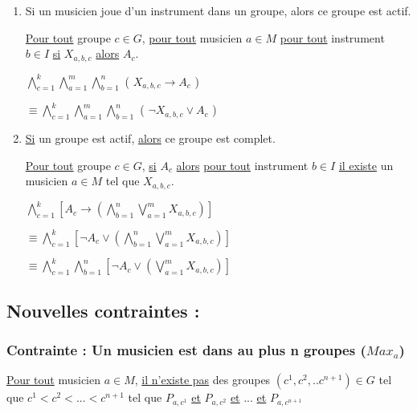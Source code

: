 \documentclass[a4paper,10pt]{article}
\begin{document}
\begin{enumerate}

 \item Si un musicien joue d'un instrument dans un groupe, alors ce groupe est actif.
 
    \underline{Pour tout} groupe $c \in G$, \underline{pour tout} musicien $a \in M$ \underline{pour tout} instrument $b \in I$  \underline{si} $X_{a,b,c}$ \underline{alors} $A_c$.
    
    $ \bigwedge \limits_{c=1}^{k} \bigwedge \limits_{a=1}^{m} \bigwedge \limits_{b=1}^{n}$ ( $ X_{a,b,c} \rightarrow A_c$ )
    
    $\equiv \bigwedge \limits_{c=1}^{k} \bigwedge \limits_{a=1}^{m} \bigwedge \limits_{b=1}^{n}$ ( $ \neg  X_{a,b,c} \vee A_c$ )

 
 
 \item \underline{Si} un groupe est actif, \underline {alors} ce groupe est complet.
 
    \underline{Pour tout} groupe $c \in G$, \underline{si} $A_c$ \underline{alors} \underline{pour tout} instrument $b \in I$ \underline{il existe} un musicien $a \in M$
    tel que $X_{a,b,c}$.
    
    
    $ \bigwedge \limits_{c=1}^{k} [ A_c \rightarrow (  \bigwedge \limits_{b=1}^{n} \bigvee \limits_{a=1}^{m} X_{a,b,c} ) ]$
    
    $\equiv \bigwedge \limits_{c=1}^{k} [ \neg A_c \vee (  \bigwedge \limits_{b=1}^{n} \bigvee \limits_{a=1}^{m} X_{a,b,c} ) ]$
    
    $\equiv \bigwedge \limits_{c=1}^{k} \bigwedge \limits_{b=1}^{n}  [ \neg A_c \vee ( \bigvee \limits_{a=1}^{m} X_{a,b,c} ) ]$
 
\end{enumerate}

\subsection{Nouvelles contraintes : }

\subsubsection{Contrainte : Un musicien est dans au plus n groupes ($Max_a$)}

\underline{Pour tout} musicien $a \in M$, \underline{il n'existe pas} des groupes $(c^1,c^2,..c^{n+1}) \in G$ tel que $c^1 < c^2 <...<c^{n+1}$ tel que $P_{a,c^1}$ \underline{et} $P_{a,c^2}$
\underline{et} ... \underline{et} $P_{a,c^{n+1}}$
 
\end{document}
